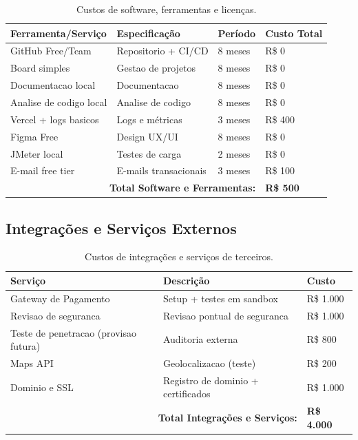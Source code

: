\begin{table}[H]
\centering
\caption{Custos de software, ferramentas e licenças.}%
\label{tab:software}
\small
\begin{tabular}{|p{4cm}|p{2.5cm}|p{2cm}|p{3.5cm}|}
\hline
\textbf{Ferramenta/Serviço} & \textbf{Especificação} & \textbf{Período} & \textbf{Custo Total} \\ \hline
GitHub Free/Team & Repositorio + CI/CD & 8 meses & R\$ 0 \\ \hline
Board simples & Gestao de projetos & 8 meses & R\$ 0 \\ \hline
Documentacao local & Documentacao & 8 meses & R\$ 0 \\ \hline
Analise de codigo local & Analise de codigo & 8 meses & R\$ 0 \\ \hline
Vercel + logs basicos & Logs e métricas & 3 meses & R\$ 400 \\ \hline
Figma Free & Design UX/UI & 8 meses & R\$ 0 \\ \hline
JMeter local & Testes de carga & 2 meses & R\$ 0 \\ \hline
E-mail free tier & E-mails transacionais & 3 meses & R\$ 100 \\ \hline
\multicolumn{3}{|r|}{\textbf{Total Software e Ferramentas:}} & \textbf{R\$ 500} \\ \hline
\end{tabular}
\end{table}

\subsection{Integrações e Serviços Externos}

\begin{table}[H]
\centering
\caption{Custos de integrações e serviços de terceiros.}%
\label{tab:integracoes}
\small
\begin{tabular}{|p{4cm}|p{3.5cm}|p{3.5cm}|}
\hline
\textbf{Serviço} & \textbf{Descrição} & \textbf{Custo} \\ \hline
Gateway de Pagamento & Setup + testes em sandbox & R\$ 1.000 \\ \hline
Revisao de seguranca & Revisao pontual de seguranca & R\$ 1.000 \\ \hline
Teste de penetracao (provisao futura) & Auditoria externa & R\$ 800 \\ \hline
Maps API & Geolocalizacao (teste) & R\$ 200 \\ \hline
Dominio e SSL & Registro de dominio + certificados & R\$ 1.000 \\ \hline
\multicolumn{2}{|r|}{\textbf{Total Integrações e Serviços:}} & \textbf{R\$ 4.000} \\ \hline
\end{tabular}
\end{table}


